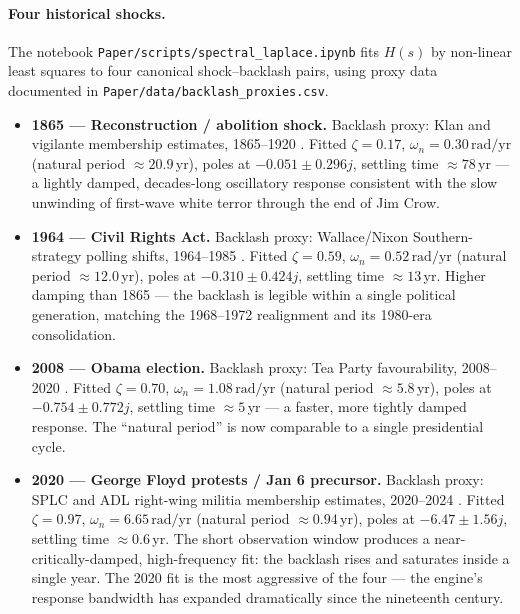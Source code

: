 \paragraph{Four historical shocks.}
The notebook \texttt{Paper/scripts/spectral\_laplace.ipynb} fits $H(s)$ by non-linear least squares to four canonical shock--backlash pairs, using proxy data documented in \texttt{Paper/data/backlash\_proxies.csv}.

\begin{itemize}
  \item \textbf{1865 --- Reconstruction / abolition shock.} Backlash proxy: Klan and vigilante membership estimates, 1865--1920 \cite{foner_reconstruction_1988,trelease_white_terror_1971}. Fitted $\zeta = 0.17$, $\omega_n = 0.30\,\text{rad/yr}$ (natural period $\approx 20.9$\,yr), poles at $-0.051 \pm 0.296j$, settling time $\approx 78$\,yr --- a lightly damped, decades-long oscillatory response consistent with the slow unwinding of first-wave white terror through the end of Jim Crow.
  \item \textbf{1964 --- Civil Rights Act.} Backlash proxy: Wallace/Nixon Southern-strategy polling shifts, 1964--1985 \cite{carter_wallace_gingrich_1996}. Fitted $\zeta = 0.59$, $\omega_n = 0.52\,\text{rad/yr}$ (natural period $\approx 12.0$\,yr), poles at $-0.310 \pm 0.424j$, settling time $\approx 13$\,yr. Higher damping than 1865 --- the backlash is legible within a single political generation, matching the 1968--1972 realignment and its 1980-era consolidation.
  \item \textbf{2008 --- Obama election.} Backlash proxy: Tea Party favourability, 2008--2020 \cite{skocpol_williamson_tea_party_2012}. Fitted $\zeta = 0.70$, $\omega_n = 1.08\,\text{rad/yr}$ (natural period $\approx 5.8$\,yr), poles at $-0.754 \pm 0.772j$, settling time $\approx 5$\,yr --- a faster, more tightly damped response. The ``natural period'' is now comparable to a single presidential cycle.
  \item \textbf{2020 --- George Floyd protests / Jan 6 precursor.} Backlash proxy: SPLC and ADL right-wing militia membership estimates, 2020--2024 \cite{splc_year_in_hate_2023,adl_center_extremism_2024}. Fitted $\zeta = 0.97$, $\omega_n = 6.65\,\text{rad/yr}$ (natural period $\approx 0.94$\,yr), poles at $-6.47 \pm 1.56j$, settling time $\approx 0.6$\,yr. The short observation window produces a near-critically-damped, high-frequency fit: the backlash rises and saturates inside a single year. The 2020 fit is the most aggressive of the four --- the engine's response bandwidth has expanded dramatically since the nineteenth century.
\end{itemize}

